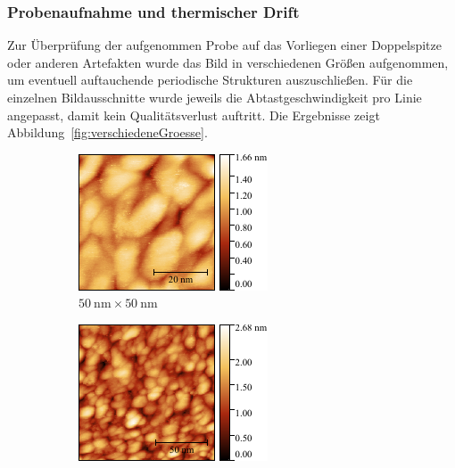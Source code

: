 \documentclass[a4paper,twoside,final]{article}
\begin{document}
\subsubsection{Probenaufnahme und thermischer Drift}
Zur Überprüfung der aufgenommen Probe auf das Vorliegen einer Doppelspitze oder anderen Artefakten wurde das Bild in verschiedenen Größen aufgenommen, um eventuell auftauchende periodische Strukturen auszuschließen.
Für die einzelnen Bildausschnitte wurde jeweils die Abtastgeschwindigkeit pro Linie angepasst, damit kein Qualitätsverlust auftritt. Die Ergebnisse zeigt Abbildung~\ref{fig:verschiedeneGroesse}.
\begin{figure}[htp]
    \centering
    \begin{subfigure}{0.3\textwidth}
        \includegraphics[width=\textwidth]{Bilder/Image01989_50nm.pdf}
        \caption{$\SI{50}{\nano\metre}\times\SI{50}{\nano\metre}$}
    \end{subfigure}
    \hspace{0.5cm}
    \begin{subfigure}{0.3\textwidth}
        \includegraphics[width=\textwidth]{Bilder/Image01985_130nm.pdf}

\end{subfigure}
\end{figure}
\end{document}
